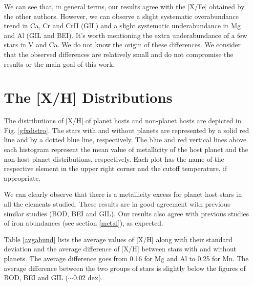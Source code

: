 \documentclass[dvips,12pt,a4paper]{report}
\begin{document}
{{We can see that, in general terms, our results agree with the [X/Fe] obtained by the other authors. However, we can observe a slight systematic overabundance trend in Ca, Cr and CrII (GIL) and a slight systematic underabundance in Mg and Al (GIL and BEI). It's worth mentioning the extra underabundance of a few stars in V and Ca. We do not know the origin of these differences. We consider that the observed differences are relatively small and do not compromise the results or the main goal of this work. 







\section{The [X/H] Distributions} 

The distributions of [X/H] of planet hosts and non-planet hosts are depicted in Fig. \ref{gfxdistro}. The stars with  and without planets are represented by a solid red line and by a dotted blue line, respectively. The blue and red vertical lines above each histogram represent the mean value of metallicity of the host planet and the non-host planet distributions, respectively. Each plot has the name of the respective element in the upper right corner and the cutoff temperature, if appropriate.

We can clearly observe that there is a metallicity excess for planet host stars in all the elements studied. These results are in good agreement with previous similar studies (BOD, BEI and GIL). Our results also agree with previous studies of iron abundances (see section \ref{metal}), as expected.

Table \ref{avgabund} lists the average values of [X/H] along with their standard deviation and the average difference of [X/H] between stars with and without planets. The average difference goes from 0.16 for Mg and Al to 0.25 for Mn. %
The average difference between the two groups of stars is slightly below the figures of BOD, BEI and GIL ($\sim$0.02 dex).

}}
\end{document}
